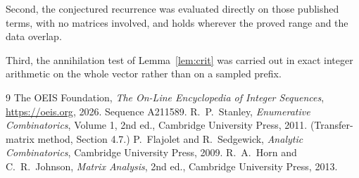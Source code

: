 \documentclass[11pt,a4paper]{article}
\theoremstyle{plain}
\theoremstyle{definition}
\begin{document}
Second, the conjectured recurrence was evaluated directly on those published terms, with no
matrices involved, and holds wherever the proved range and the data overlap.

Third, the annihilation test of Lemma~\ref{lem:crit} was carried out in exact integer
arithmetic on the whole vector rather than on a sampled prefix.

\begin{thebibliography}{9}
 The OEIS Foundation, \emph{The On-Line Encyclopedia of Integer
Sequences}, \url{https://oeis.org}, 2026. Sequence A211589.
 R.~P.~Stanley, \emph{Enumerative Combinatorics}, Volume 1, 2nd ed.,
Cambridge University Press, 2011. (Transfer-matrix method, Section 4.7.)
 P.~Flajolet and R.~Sedgewick, \emph{Analytic Combinatorics}, Cambridge
University Press, 2009.
 R.~A.~Horn and C.~R.~Johnson, \emph{Matrix Analysis}, 2nd ed., Cambridge
University Press, 2013.
\end{thebibliography}
\end{document}

